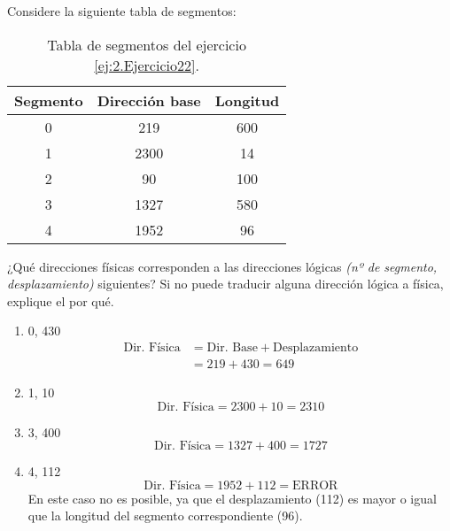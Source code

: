 \begin{ejercicio}\label{ej:2.Ejercicio22}
    Considere la siguiente tabla de segmentos:
    \begin{table}[H]
        \centering
        \begin{tabular}{|c|c|c|}
            \hline
            \textbf{Segmento} & \textbf{Dirección base} & \textbf{Longitud} \\ \hline
            0 & 219 & 600 \\
            1 & 2300 & 14 \\
            2 & 90 & 100 \\
            3 & 1327 & 580 \\
            4 & 1952 & 96 \\ \hline
        \end{tabular}
        \caption{Tabla de segmentos del ejercicio \ref{ej:2.Ejercicio22}.}
        \label{tab:ej22}
    \end{table}
    
    ¿Qué direcciones físicas corresponden a las direcciones lógicas \textit{(nº de segmento, desplazamiento)} siguientes? Si no puede traducir alguna dirección lógica a física, explique el por qué.
    \begin{enumerate}
        \item 0, 430
        \begin{equation*}\begin{split}
            \text{Dir. Física} &= \text{Dir. Base} + \text{Desplazamiento} \\
            &= 219 + 430 = 649
        \end{split}\end{equation*}
        \item 1, 10
        \begin{equation*}
            \text{Dir. Física} = 2300 + 10 = 2310
        \end{equation*}
        \item 3, 400
        \begin{equation*}
            \text{Dir. Física} = 1327 + 400 = 1727
        \end{equation*}
        \item 4, 112
        \begin{equation*}
            \text{Dir. Física} = 1952 + 112 = \text{ERROR}
        \end{equation*}
        En este caso no es posible, ya que el desplazamiento (112) es mayor o igual que la longitud del segmento correspondiente (96).
    \end{enumerate}
\end{ejercicio}

